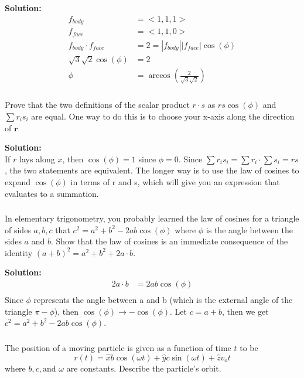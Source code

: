 \documentclass{article}
\newcommand\Problem{%
    \subsubsection{}%
}
\newcommand\TheSolution{%
  \textbf{Solution:}\\%
}
\begin{document}
\TheSolution
\begin{equation}
    \begin{aligned}
        f_{body}                & = <1,1,1>                            \\
        f_{face}                & = <1,1,0>                            \\
        f_{body} \cdot f_{face} & = 2 = |f_{body}||f_{face}|\cos(\phi) \\
        \sqrt3\sqrt2\cos(\phi)  & = 2                                  \\
        \phi                    & = \arccos(\frac{2}{\sqrt3\sqrt2})
    \end{aligned}
\end{equation}
\begin{center}
    \boxed{35.26\deg}
\end{center}

\Problem Prove that the two definitions of the scalar product $r \cdot s$ as $rs\cos(\phi)$ and $\sum r_i s_i$ are equal. One way to do this is to choose your x-axis along the direction of $\boldsymbol{r}$

\TheSolution
If $r$ lays along $x$, then $\cos(\phi) = 1$ since $\phi = 0$. Since $\sum r_i s_i = \sum r_i \cdot \sum s_i = rs$, the two statements are equivalent. The longer way is to use the law of cosines to expand $\cos(\phi)$ in terms of r and s, which will give you an expression that evaluates to a summation.

\Problem
In elementary trigonometry, you probably learned the law of cosines for a triangle of sides $a, b, c$ that $c^2 = a^2 + b^2 - 2ab\cos(\phi)$ where $\phi$ is the angle between the sides $a$ and $b$. Show that the law of cosines is an immediate consequence of the identity $(a + b)^2 = a^2 + b^2 + 2 a \cdot b$.

\TheSolution
\begin{equation}
    \begin{aligned}
        2a \cdot b & = 2ab\cos(\phi) \\
    \end{aligned}
\end{equation}
Since $\phi$ represents the angle between a and b (which is the external angle of the triangle $\pi - \phi$), then $\cos(\phi) \rightarrow -\cos(\phi)$. Let $c = a + b$, then we get $c^2 = a^2 + b^2 - 2ab\cos(\phi)$.

\Problem
The position of a moving particle is given as a function of time $t$ to be
\[r(t) = \hat{x}b\cos(\omega t) + \hat{y}c\sin(\omega t) + \hat{z}v_o t\]
where $b, c, \text{and } \omega$ are constants. Describe the particle's orbit.
\end{document}
